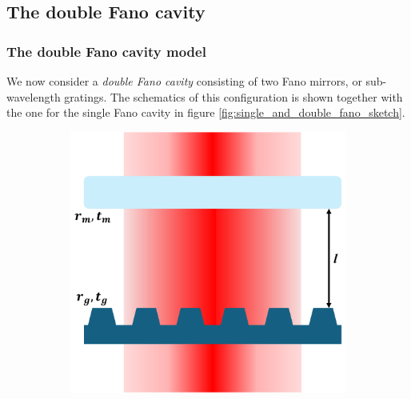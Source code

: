 \subsection{The double Fano cavity}

\subsubsection{The double Fano cavity model}

We now consider a \emph{double Fano cavity} consisting of two Fano mirrors, or sub-wavelength gratings. The schematics of this configuration is shown together with the one for the single Fano cavity in figure \ref{fig:single_and_double_fano_sketch}.

\begin{figure}[h!]
    \centering
    \begin{subfigure}[b]{0.3\textwidth}
        \includegraphics[width=\textwidth]{figures/single_fano_sketch.pdf}
        \caption{}
        \label{fig:single_fano_sketch2}
    \end{subfigure}
    \hspace{1cm}
    \begin{subfigure}[b]{0.3\textwidth}

\end{subfigure}
\end{figure}
